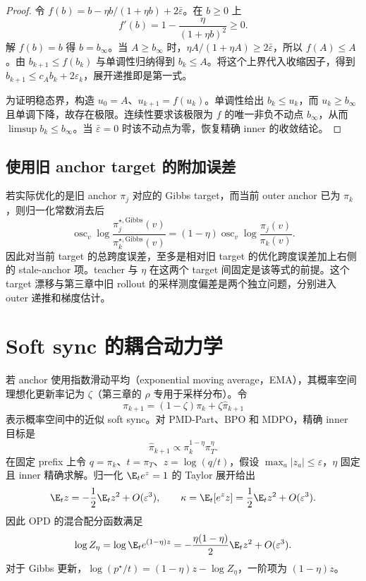 \begin{proof}
令 $f(b)=b-\eta b/(1+\eta b)+2\bar\varepsilon$。在 $b\geq0$ 上
\[
 f'(b)=1-\frac{\eta}{(1+\eta b)^2}\geq0.
\]
解 $f(b)=b$ 得 $b=b_\infty$。当 $A\geq b_\infty$ 时，$\eta A/(1+\eta A)\geq2\bar\varepsilon$，所以 $f(A)\leq A$。由 $b_{k+1}\leq f(b_k)$ 与单调性归纳得到 $b_k\leq A$。将这个上界代入收缩因子，得到 $b_{k+1}\leq c_A b_k+2\varepsilon_k$，展开递推即是第一式。

为证明稳态界，构造 $u_0=A$、$u_{k+1}=f(u_k)$。单调性给出 $b_k\leq u_k$，而 $u_k\geq b_\infty$ 且单调下降，故存在极限。连续性要求该极限为 $f$ 的唯一非负不动点 $b_\infty$，从而 $\limsup b_k\leq b_\infty$。当 $\bar\varepsilon=0$ 时该不动点为零，恢复精确 inner 的收敛结论。
\end{proof}

\subsection{使用旧 anchor target 的附加误差}

若实际优化的是旧 anchor $\pi_j$ 对应的 Gibbs target，而当前 outer anchor 已为 $\pi_k$，则归一化常数消去后
\[
 \operatorname{osc}_v
 \log\frac{\pi_j^{\star,\mathrm{Gibbs}}(v)}
          {\pi_k^{\star,\mathrm{Gibbs}}(v)}
 =(1-\eta)\operatorname{osc}_v\log\frac{\pi_j(v)}{\pi_k(v)}.
\]
因此对当前 target 的总跨度误差，至多是相对旧 target 的优化跨度误差加上右侧的 stale-anchor 项。teacher 与 $\eta$ 在这两个 target 间固定是该等式的前提。这个 target 漂移与第三章中旧 rollout 的采样测度偏差是两个独立问题，分别进入 outer 递推和梯度估计。

\section{Soft sync 的耦合动力学}

若 anchor 使用指数滑动平均（exponential moving average，EMA），其概率空间理想化更新率记为 $\zeta$（第三章的 $\rho$ 专用于采样分布）。令
\[
 \pi_{k+1}=(1-\zeta)\pi_k+\zeta\widehat\pi_{k+1}
\]
表示概率空间中的近似 soft sync。对 PMD-Part、BPO 和 MDPO，精确 inner 目标是
\[
 \widehat\pi_{k+1}\propto\pi_k^{1-\eta}\pi_T^\eta.
\]
在固定 prefix 上令 $q=\pi_k$、$t=\pi_T$、$z=\log(q/t)$，假设 $\max_a|z_a|\le\varepsilon$，$\eta$ 固定且 inner 精确求解。归一化 $\E_te^z=1$ 的 Taylor 展开给出
\[
\E_tz=-\frac12\E_tz^2+O(\varepsilon^3),\qquad
\kappa=\E_t[e^zz]=\frac12\E_tz^2+O(\varepsilon^3).
\]
因此 OPD 的混合配分函数满足
\[
\log Z_\eta=\log\E_te^{(1-\eta)z}
=-\frac{\eta(1-\eta)}2\E_tz^2+O(\varepsilon^3).
\]
对于 Gibbs 更新，$\log(p^\star/t)=(1-\eta)z-\log Z_\eta$，一阶项为 $(1-\eta)z$。


